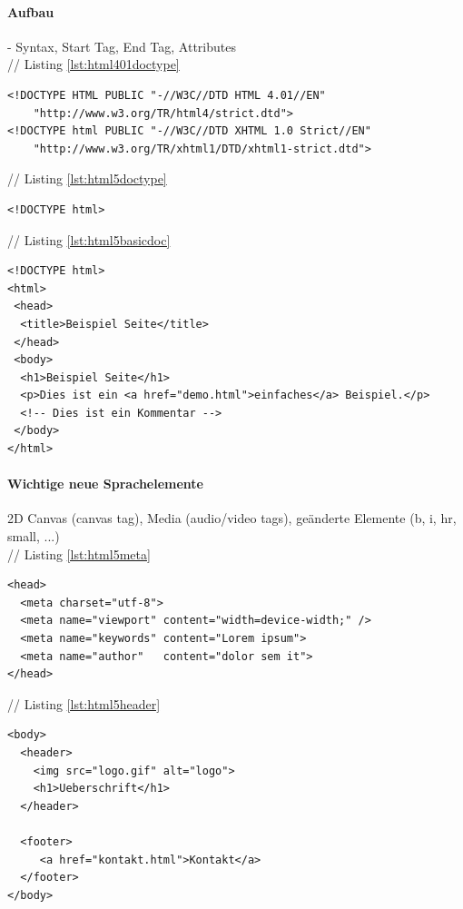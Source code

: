 \documentclass[12pt,a4paper,bibliography=totocnumbered,listof=totocnumbered]{scrartcl}
\begin{document}
\paragraph{Aufbau} - Syntax, Start Tag, End Tag, Attributes\\
// Listing \ref{lst:html401doctype}    
    \vspace{1em}
	\begin{lstlisting}[caption=(X)HTML4.01 Doctype, label=lst:html401doctype]
<!DOCTYPE HTML PUBLIC "-//W3C//DTD HTML 4.01//EN"
    "http://www.w3.org/TR/html4/strict.dtd">
<!DOCTYPE html PUBLIC "-//W3C//DTD XHTML 1.0 Strict//EN"
    "http://www.w3.org/TR/xhtml1/DTD/xhtml1-strict.dtd">
	\end{lstlisting}
	
// Listing \ref{lst:html5doctype}	
    \vspace{1em}
	\begin{lstlisting}[caption=HTML5 Doctype, label=lst:html5doctype]
<!DOCTYPE html>
	\end{lstlisting}		
	
// Listing \ref{lst:html5basicdoc}
	\vspace{1em}
	\begin{lstlisting}[caption=HTML5 Basis Dokument, label=lst:html5basicdoc]
<!DOCTYPE html>
<html>
 <head>
  <title>Beispiel Seite</title>
 </head>
 <body>
  <h1>Beispiel Seite</h1>
  <p>Dies ist ein <a href="demo.html">einfaches</a> Beispiel.</p>
  <!-- Dies ist ein Kommentar -->
 </body>
</html>
	\end{lstlisting}

\paragraph{Wichtige neue Sprachelemente} 2D Canvas (canvas tag), Media (audio/video tags), geänderte Elemente (b, i, hr, small, ...)\\

// Listing \ref{lst:html5meta}	
    \vspace{1em}
	\begin{lstlisting}[caption=HTML5 Microdata, label=lst:html5meta]
<head>
  <meta charset="utf-8">
  <meta name="viewport" content="width=device-width;" />
  <meta name="keywords" content="Lorem ipsum">
  <meta name="author"   content="dolor sem it">
</head>
	\end{lstlisting}
	
// Listing \ref{lst:html5header}	
    \vspace{1em}
	\begin{lstlisting}[caption=HTML5 Header und Footer, label=lst:html5header]
<body>
  <header>
    <img src="logo.gif" alt="logo">
    <h1>Ueberschrift</h1>
  </header>

  <footer>
     <a href="kontakt.html">Kontakt</a>
  </footer>
</body>
	\end{lstlisting}
	
\end{document}
